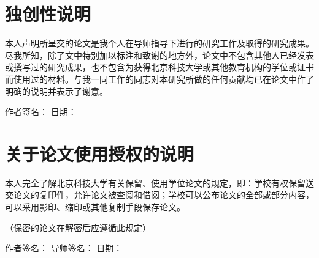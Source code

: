 
\chapter*{独创性说明}

本人声明所呈交的论文是我个人在导师指导下进行的研究工作及取得的研究成果。尽我所知，除了文中特别加以标注和致谢的地方外，论文中不包含其他人已经发表或撰写过的研究成果，也不包含为获得北京科技大学或其他教育机构的学位或证书而使用过的材料。与我一同工作的同志对本研究所做的任何贡献均已在论文中作了明确的说明并表示了谢意。

\vspace{3em}
\begin{flushright}
作者签名：\underline{\makebox[4cm]{\hfill}}\qquad
日期：\underline{\makebox[4cm]{\hfill}}
\end{flushright}

\clearpage

\chapter*{关于论文使用授权的说明}

本人完全了解北京科技大学有关保留、使用学位论文的规定，即：学校有权保留送交论文的复印件，允许论文被查阅和借阅；学校可以公布论文的全部或部分内容，可以采用影印、缩印或其他复制手段保存论文。

（保密的论文在解密后应遵循此规定）

\vspace{3em}
\begin{flushright}
作者签名：\underline{\makebox[3.5cm]{\hfill}}\qquad
导师签名：\underline{\makebox[3.5cm]{\hfill}}\qquad
日期：\underline{\makebox[3.5cm]{\hfill}}
\end{flushright}
